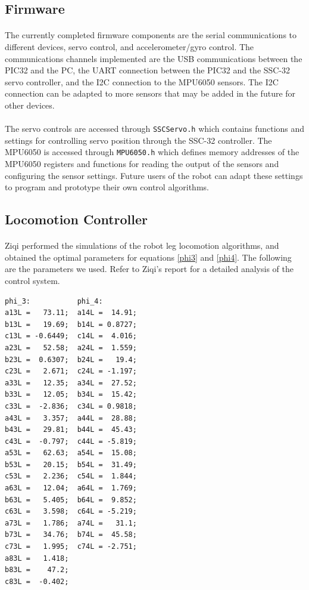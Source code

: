 \documentclass[titlepage,letterpaper,12pt]{article}
\begin{document}
\subsection{Firmware}
\paragraph{}The currently completed firmware components are the serial
communications to different devices, servo control, and accelerometer/gyro
control.  The communications channels implemented are the USB communications
between the PIC32 and the PC, the UART connection between the PIC32 and the
SSC-32 servo controller, and the I2C connection to the MPU6050 sensors. The I2C
connection can be adapted to more sensors that may be added in the future for
other devices. 

\paragraph{}The servo controls are accessed through \verb!SSCServo.h! which
contains functions and settings for controlling servo position through the
SSC-32 controller. The MPU6050 is accessed through \verb!MPU6050.h! which
defines memory addresses of the MPU6050 registers and functions for reading the
output of the sensors and configuring the sensor settings. Future users of the
robot can adapt these settings to program and prototype their own control
algorithms.

\subsection{Locomotion Controller}
\paragraph{}Ziqi performed the simulations of the robot leg locomotion
algorithms, and obtained the optimal parameters for equations \ref{phi3} and
\ref{phi4}. The following are the parameters we used. Refer to Ziqi's report for
a detailed analysis of the control system.
\begin{verbatim}
phi_3:           phi_4:
a13L =   73.11;  a14L =  14.91;
b13L =   19.69;  b14L = 0.8727;
c13L = -0.6449;  c14L =  4.016;
a23L =   52.58;  a24L =  1.559;
b23L =  0.6307;  b24L =   19.4;
c23L =   2.671;  c24L = -1.197;
a33L =   12.35;  a34L =  27.52;
b33L =   12.05;  b34L =  15.42;
c33L =  -2.836;  c34L = 0.9818;
a43L =   3.357;  a44L =  28.88;
b43L =   29.81;  b44L =  45.43;
c43L =  -0.797;  c44L = -5.819;
a53L =   62.63;  a54L =  15.08;
b53L =   20.15;  b54L =  31.49;
c53L =   2.236;  c54L =  1.844;
a63L =   12.04;  a64L =  1.769;
b63L =   5.405;  b64L =  9.852;
c63L =   3.598;  c64L = -5.219;
a73L =   1.786;  a74L =   31.1;
b73L =   34.76;  b74L =  45.58;
c73L =   1.995;  c74L = -2.751;
a83L =   1.418;
b83L =    47.2;
c83L =  -0.402;
\end{verbatim}
\end{document}
